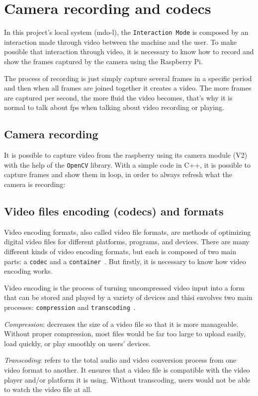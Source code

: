 %
\section{Camera recording and codecs}
\label{sec:camera-record-codecs}

In this project's local system (\gls{mdo-l}), the \texttt{Interaction Mode} is composed by an interaction made through video between the machine and the user.
To make possible that interaction through video, it is necessary to know how to record and show the frames captured by the camera using the Raspberry Pi. 

The process of recording is just simply capture several frames in a specific period and then when all frames are joined together it creates a video.
The more frames are captured per second, the more fluid the video becomes, that's why it is normal to talk about \gls{fps} when talking about video recording or playing.

\subsection{Camera recording}
\label{sub-sec:camera-record}
It is possible to capture video from the raspberry using its camera module (V2) with the help of the \texttt{OpenCV} library.
With a simple code in C++, it is possible to capture frames and show them in loop, in order to always refresh what the camera is recording:
%


\subsection{Video files encoding (codecs) and formats}
\label{sub-sec:codecs-and-formats}
Video encoding formats, also called video file formats, are methods of optimizing digital video files for different platforms, programs, and devices.
There are many different kinds of video encoding formats, but each is composed of two main parts: a \texttt{codec} and a \texttt{container}~\cite{video-encoding}. But firstly, it is necessary to know how video encoding works.

Video encoding is the process of turning uncompressed video input into a form that can be stored and played by a variety of devices and thisi envolves two main processes: \texttt{compression} and \texttt{transcoding}~\cite{video-encoding}.
%
\begin{item-c}
\item \emph{Compression}: decreases the size of a video file so that it is more manageable. Without proper compression, most files would be far too large to upload easily, load quickly, or play smoothly on users' devices.
\item \emph{Transcoding}: refers to the total audio and video conversion process from one video format to another. It ensures that a video file is compatible with the video player and/or platform it is using. Without transcoding, users would not be able to watch the video file at all.
\end{item-c}

